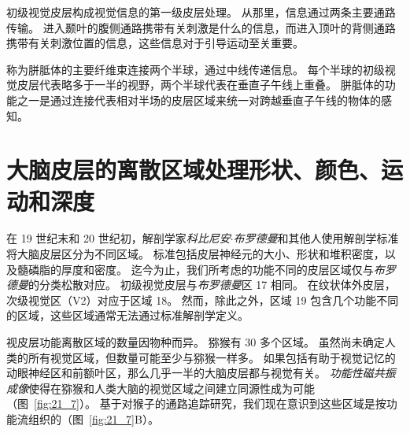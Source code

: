 初级视觉皮层构成视觉信息的第一级皮层处理。
从那里，信息通过两条主要通路传输。
进入颞叶的腹侧通路携带有关刺激是什么的信息，而进入顶叶的背侧通路携带有关刺激位置的信息，这些信息对于引导运动至关重要。


称为胼胝体的主要纤维束连接两个半球，通过中线传递信息。
每个半球的初级视觉皮层代表略多于一半的视野，两个半球代表在垂直子午线上重叠。
胼胝体的功能之一是通过连接代表相对半场的皮层区域来统一对跨越垂直子午线的物体的感知。



\section{大脑皮层的离散区域处理形状、颜色、运动和深度}

在 19 世纪末和 20 世纪初，解剖学家\textit{科比尼安$\cdot$布罗德曼}和其他人使用解剖学标准将大脑皮层区分为不同区域。
标准包括皮层神经元的大小、形状和堆积密度，以及髓磷脂的厚度和密度。
迄今为止，我们所考虑的功能不同的皮层区域仅与\textit{布罗德曼}的分类松散对应。
初级视觉皮层与\textit{布罗德曼}区 17 相同。
在纹状体外皮层，次级视觉区（V2）对应于区域 18。
然而，除此之外，区域 19 包含几个功能不同的区域，这些区域通常无法通过标准解剖学定义。


视皮层功能离散区域的数量因物种而异。
猕猴有 30 多个区域。
虽然尚未确定人类的所有视觉区域，但数量可能至少与猕猴一样多。
如果包括有助于视觉记忆的动眼神经区和前额叶区，那么几乎一半的大脑皮层都与视觉有关。
\textit{功能性磁共振成像}使得在猕猴和人类大脑的视觉区域之间建立同源性成为可能（图~\ref{fig:21_7}）。
基于对猴子的通路追踪研究，我们现在意识到这些区域是按功能流组织的（图~\ref{fig:21_7}B）。


